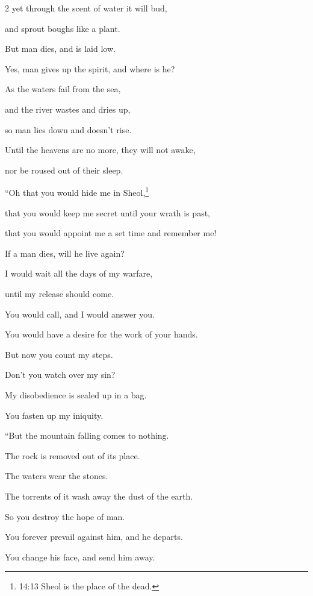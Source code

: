 \begin{multicols}{2}
	\myverse{}yet through the scent of water it will bud,
	
	and sprout boughs like a plant.
	
	\myverse{}But man dies, and is laid low.
	
	Yes, man gives up the spirit, and where is he?
	
	\myverse{}As the waters fail from the sea,
	
	and the river wastes and dries up,
	
	\myverse{}so man lies down and doesn’t rise.
	
	Until the heavens are no more, they will not awake,
	
	nor be roused out of their sleep.
	
	\vspace{\baselineskip}
	
	\myverse{}“Oh that you would hide me in Sheol,\footnote{14:13 Sheol is the place of the dead.}
	
	that you would keep me secret until your wrath is past,
	
	that you would appoint me a set time and remember me!
	
	\myverse{}If a man dies, will he live again?
	
	I would wait all the days of my warfare,
	
	until my release should come.
	
	\myverse{}You would call, and I would answer you.
	
	You would have a desire for the work of your hands.
	
	\myverse{}But now you count my steps.
	
	Don’t you watch over my sin?
	
	\myverse{}My disobedience is sealed up in a bag.
	
	You fasten up my iniquity.
	
	\vspace{\baselineskip}
	
	\myverse{}“But the mountain falling comes to nothing.
	
	The rock is removed out of its place.
	
	\myverse{}The waters wear the stones.
	
	The torrents of it wash away the dust of the earth.
	
	So you destroy the hope of man.
	
	\myverse{}You forever prevail against him, and he departs.
	
	You change his face, and send him away.
	

\end{multicols}
